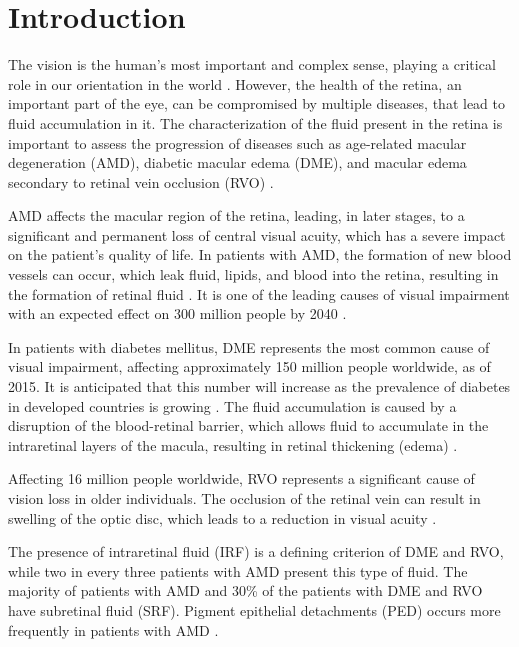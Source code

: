 \chapter{Introduction}
The vision is the human's most important and complex sense, playing a critical role in our orientation in the world \parencite{Hutmacher2019}. However, the health of the retina, an important part of the eye, can be compromised by multiple diseases, that lead to fluid accumulation in it. The characterization of the fluid present in the retina is important to assess the progression of diseases such as age-related macular degeneration (AMD), diabetic macular edema (DME), and macular edema secondary to retinal vein occlusion (RVO) \parencite{Bogunovic2019a}.
\par
AMD affects the macular region of the retina, leading, in later stages, to a significant and permanent loss of central visual acuity, which has a severe impact on the patient's quality of life. In patients with AMD, the formation of new blood vessels can occur, which leak fluid, lipids, and blood into the retina, resulting in the formation of retinal fluid \parencite{Lim2012}. It is one of the leading causes of visual impairment with an expected effect on 300 million people by 2040 \parencite{Mitchell2018}.
\par
In patients with diabetes mellitus, DME represents the most common cause of visual impairment, affecting approximately 150 million people worldwide, as of 2015. It is anticipated that this number will increase as the prevalence of diabetes in developed countries is growing \parencite{Musat2015}. The fluid accumulation is caused by a disruption of the blood-retinal barrier, which allows fluid to accumulate in the intraretinal layers of the macula, resulting in retinal thickening (edema) \parencite{Bhagat2009, Bandello2019}.
\par
Affecting 16 million people worldwide, RVO represents a significant cause of vision loss in older individuals. The occlusion of the retinal vein can result in swelling of the optic disc, which leads to a reduction in visual acuity \parencite{Wong2010}. 
\par
The presence of intraretinal fluid (IRF) is a defining criterion of DME and RVO, while two in every three patients with AMD present this type of fluid. The majority of patients with AMD and 30\% of the patients with DME and RVO have subretinal fluid (SRF). Pigment epithelial detachments (PED) occurs more frequently in patients with AMD \parencite{Bogunovic2019a}.
\par
